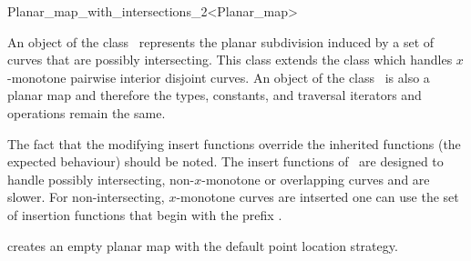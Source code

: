 
\ccRefPageBegin

\begin{ccRefClass}{Planar_map_with_intersections_2<Planar_map>}

\ccDefinition An object  of the class
    \ccClassTemplateName\ represents the planar
    subdivision induced by a set of curves that are possibly intersecting.
    This class extends the class 
    which handles $x$-monotone pairwise interior disjoint
    curves.  %
    An object of the class \ccClassTemplateName\ is also a planar map and
    therefore the types, constants, and traversal iterators and operations remain
    the same.


\ccInheritsFrom

    The fact that the modifying insert functions override the
    inherited functions (the expected behaviour) should be noted. The
    insert functions of \ccRefName\ are designed to handle possibly
    intersecting, non-$x$-monotone or overlapping curves and are
    slower.  For non-intersecting, $x$-monotone curves are intserted
    one can use the set of insertion functions that begin with the
    prefix .

\ccTypes


\ccCreation

     {creates an empty planar map with the default point location strategy.}


\end{ccRefClass}
